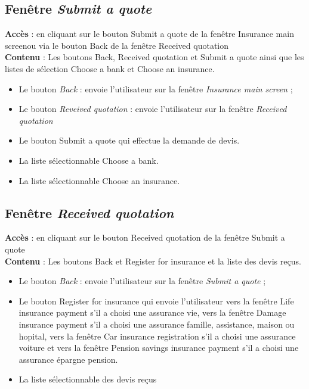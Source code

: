\documentclass{article}
\newcommand{\navbutton}[2]{Le bouton \emph{#1} : envoie l'utilisateur sur la fenêtre \emph{#2}}
\newcommand{\access}[1]{ \noindent\textbf{Accès} : #1 \\}
\newcommand{\content}[1]{\textbf{Contenu} : #1}
\begin{document}
\subsection{Fenêtre \emph{Submit a quote}}
\access{en cliquant sur le bouton Submit a quote de la fenêtre Insurance main screenou via le bouton Back de la fenêtre Received quotation}
\content{Les boutons Back, Received quotation et Submit a quote ainsi que les listes de sélection Choose a bank et Choose an insurance.}
\begin{itemize}
\item \navbutton{Back}{Insurance main screen} ;
\item \navbutton{Reveived quotation}{Received quotation}
\item Le bouton Submit a quote qui effectue la demande de devis.
\item La liste sélectionnable Choose a bank.
\item La liste sélectionnable Choose an insurance.
\end{itemize}


\subsection{Fenêtre \emph{Received quotation}}
\access{en cliquant sur le bouton Received quotation de la fenêtre Submit a quote}
\content{Les boutons Back et Register for insurance et la liste des devis reçus.}
\begin{itemize}
\item \navbutton{Back}{Submit a quote} ;
\item Le bouton Register for insurance qui envoie l'utilisateur vers la fenêtre Life insurance payment s'il a choisi une assurance vie, vers la fenêtre Damage insurance payment s'il a choisi une assurance famille, assistance, maison ou hopital, vers la fenêtre Car insurance registration s'il a choisi une assurance voiture et vers la fenêtre Pension savings insurance payment s'il a choisi une assurance épargne pension.
\item La liste sélectionnable des devis reçus
\end{itemize}
\end{document}
